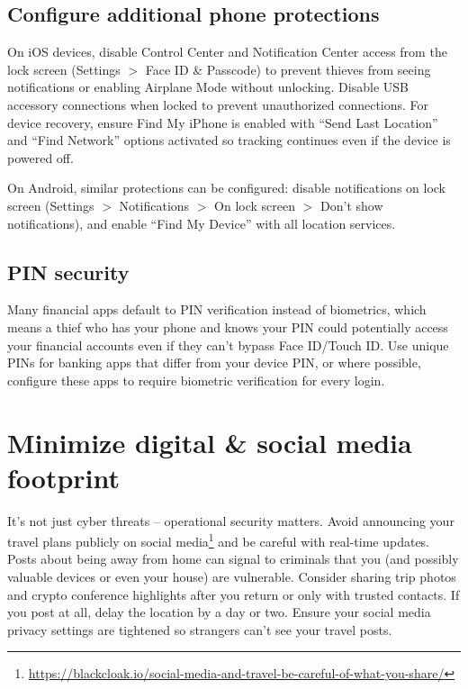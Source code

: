 \subsection{Configure additional phone protections}

On iOS devices, disable Control Center and Notification
Center access from the lock screen (Settings $>$ Face ID
\& Passcode) to prevent thieves from seeing notifications
or enabling Airplane Mode without unlocking. Disable USB
accessory connections when locked to prevent unauthorized
connections. For device recovery, ensure Find My iPhone is
enabled with ``Send Last Location'' and ``Find Network''
options activated so tracking continues even if the device
is powered off.

On Android, similar protections can be configured: disable
notifications on lock screen (Settings $>$ Notifications
$>$ On lock screen $>$ Don't show notifications), and
enable ``Find My Device'' with all location services.

\subsection{PIN security}

Many financial apps default to PIN verification instead of
biometrics, which means a thief who has your phone and
knows your PIN could potentially access your financial
accounts even if they can't bypass Face ID/Touch ID. Use
unique PINs for banking apps that differ from your device
PIN, or where possible, configure these apps to require
biometric verification for every login.

\section{Minimize digital \& social media footprint}

It's not just cyber threats -- operational security
matters. Avoid announcing your travel plans publicly on
social
media\footnote{\url{https://blackcloak.io/social-media-and-travel-be-careful-of-what-you-share/}}
and be careful with real-time updates. Posts about being
away from home can signal to criminals that you (and
possibly valuable devices or even your house) are
vulnerable. Consider sharing trip photos and crypto
conference highlights after you return or only with
trusted contacts. If you post at all, delay the location
by a day or two. Ensure your social media privacy settings
are tightened so strangers can't see your travel posts.


